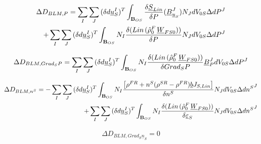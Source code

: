 \documentclass[12pt]{article}
\begin{document}
	\begin{equation*}
		\begin{aligned}
			\Delta D_{BLM, P}=\sum_{I}\sum_{J}{(\delta d \underline{u}_{S}^{I})^{T}}\int_{\mathbf{B}_{OS}}{\frac{\delta \underline{S}_{Lin}}{\delta P}}({\underline{B}_{\underline{u}_{S}}^{J}}){{N_{J}}}{dV_{0S}}{\Delta  dP^{J}}\\ +\sum_{I}\sum_{J}{(\delta d \underline{u}_{S}^{I})^{T}}\int_{\mathbf{B}_{OS}}{N_{I}}{{\frac{\delta (Lin\hspace{0.5mm} ({\hat{\rho}_{0}^{F}}\hspace{0.5mm}{\underline{W}_{FS0}}))}{\delta P}}}{{N_{J}}}{dV_{0S}}{\Delta  dP^{J}}
		\end{aligned}    
	\end{equation*}
	
	\begin{equation*}
		\begin{aligned}
			\Delta D_{BLM, {Grad_{S}}P} = \sum_{I}\sum_{J}{(\delta d \underline{u}_{S}^{I})^{T}}\int_{\mathbf{B}_{OS}}{N_{I}}{\frac{\delta (Lin\hspace{0.5mm} ({\hat{\rho}_{0}^{F}}\hspace{0.5mm}{\underline{W}_{FS0}}))}{\delta {Grad_{S}}P}}{\underline{B}_{P}^{J}}{dV_{0S}}{\Delta  dP^{J}}
		\end{aligned}
	\end{equation*}
	
	\begin{equation*}
		\begin{aligned}
			\Delta D_{BLM, n^{S}} = - \sum_{I}\sum_{J}{(\delta d \underline{u}_{S}^{I})^{T}}\int_{\mathbf{B}_{OS}}{N_{I}}{\frac{{\left[{{\rho^{FR}}+{n^S}{({\rho^{SR}}-{\rho^{FR}})}}{\underline{b}}{J_{S, Lin}}    \right]}}{\delta n^{S}}}{N_{J}}{dV_{0S}}{\Delta d{n^S}^{J}}\\+
			\sum_{I}\sum_{J}{(\delta d \underline{u}_{S}^{I})^{T}}\int_{\mathbf{B}_{OS}}{N_{I}}{{\frac{\delta (Lin\hspace{0.5mm} ({\hat{\rho}_{0}^{F}}\hspace{0.5mm}{\underline{W}_{FS0}}))}{\delta \underline{\varepsilon}_{S}}}}{N_{J}}{dV_{0S}}{\Delta d{n^S}^{J}}
		\end{aligned}
	\end{equation*}
	
	\begin{equation*}
		\begin{aligned}
			\Delta D_{BLM, {Grad_{S}}\underline{n}_{S}} = 0
		\end{aligned}
	\end{equation*}
	
\end{document}
